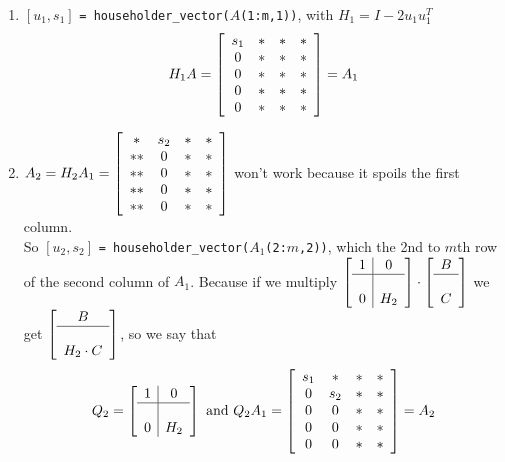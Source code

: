 \documentclass[10pt]{report}
\begin{document}
\begin{enumerate}
	\item $[u_1, s_1]$ \texttt{= householder\_vector($A$(1:m,1))}, with $H_1 = I-2u_1u_1^T$
	$$H_1A = \left[\begin{array}{c c c c}
	s_1&*&*&*\\
	0&*&*&*\\
	0&*&*&*\\
	0&*&*&*\\
	0&*&*&*\\
	\end{array}\right] = A_1$$
	\item $A_2 = H_2A_1 = \left[\begin{array}{c c c c}
	*&s_2&*&*\\
	**&0&*&*\\
	**&0&*&*\\
	**&0&*&*\\
	**&0&*&*\\
	\end{array}\right]$ won't work because it spoils the first column.\\
	So $[u_2,s_2]$ \texttt{= householder\_vector($A_1$(2:$m$,2))}, which the 2nd to $m$th row of the second column of $A_1$. Because if we multiply $\left[\begin{array}{c | c}
	1 & 0\\
	\hline\\
	0 & H_2
	\end{array}\right]\cdot\left[\begin{array}{c}
	B\\\hline\\C
	\end{array}\right]$ we get $\left[\begin{array}{c}
	B\\\hline\\H_2\cdot C
	\end{array}\right]$, so we say that $$Q_2 = \left[\begin{array}{c | c}
	1 & 0\\
	\hline\\
	0 & H_2
	\end{array}\right]\text{ and }Q_2A_1 = \left[\begin{array}{c c c c}
	s_1&*&*&*\\
	0&s_2&*&*\\
	0&0&*&*\\
	0&0&*&*\\
	0&0&*&*\\
	\end{array}\right] = A_2$$

\end{enumerate}
\end{document}
